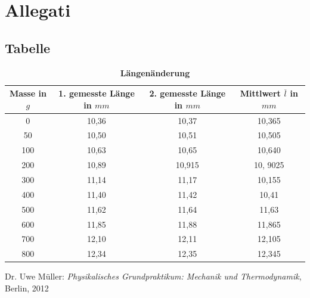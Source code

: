 \documentclass[a4paper,11pt]{article}
\begin{document}
	\section{Allegati}

\subsection{Tabelle}
\begin{table}[ht] \centering \caption {\bf Längenänderung}	
\begin{tabular}{c|c|c|c|}
Masse in $g$ & 1. gemesste Länge in $mm$ & 2. gemesste Länge in $mm$ & Mittlwert $\overline l$ in $mm$ \\ \hline
0 & 10,36 & 10,37 & 10,365\\
50 & 10,50 & 10,51 & 10,505\\
100 & 10,63 & 10,65 & 10,640\\
200 & 10,89 & 10,915 & 10, 9025\\
300 & 11,14 & 11,17 & 10,155\\
400 & 11,40 & 11,42 & 10,41\\
500 & 11,62 & 11,64 & 11,63\\
600 & 11,85 & 11,88 & 11,865\\
700 & 12,10 & 12,11 & 12,105\\
800 & 12,34 & 12,35 & 12,345
\end{tabular}
\end{table}
	

	\begin{thebibliography}{1}
		Dr. Uwe Müller: \textit{Physikalisches Grundpraktikum: Mechanik und Thermodynamik}, Berlin, 2012
	\end{thebibliography}
\end{document}
